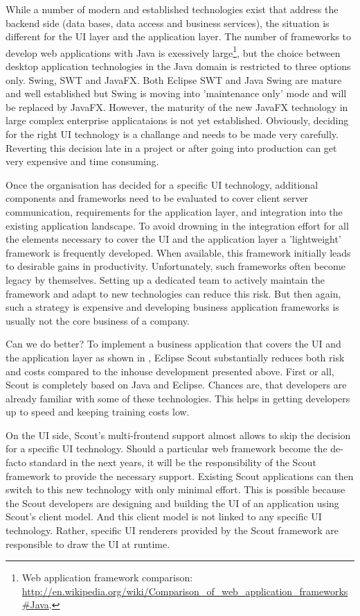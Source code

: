 \documentclass[a4paper,10pt,twoside]{book}
\begin{document}
While a number of modern and established technologies exist that address the backend side (data bases, data access and business services), the situation is different for the UI layer and the application layer. 
The number of frameworks to develop web applications with Java is exessively large\footnote{
Web application framework comparison: \url{http://en.wikipedia.org/wiki/Comparison_of_web_application_frameworks#Java}.
},
but the choice between desktop application technologies in the Java domain is restricted to three options only. 
Swing, SWT and JavaFX.
Both Eclipse SWT and Java Swing are mature and well established but Swing is moving into 'maintenance only' mode and will be replaced by JavaFX.
However, the maturity of the new JavaFX technology in large complex enterprise applicataions is not yet established. 
Obviously, deciding for the right UI technology is a challange and needs to be made very carefully. 
Reverting this decision late in a project or after going into production can get very expensive and time consuming. 

Once the organisation has decided for a specific UI technology, additional components and frameworks need to be evaluated to cover client server communication, requirements for the application layer, and integration into the existing application landscape. 
To avoid drowning in the integration effort for all the elements necessary to cover the UI and the application layer a 'lightweight' framework is frequently developed. 
When available, this framework initially leads to desirable gains in productivity. 
Unfortunately, such frameworks often become legacy by themselves. 
Setting up a dedicated team to actively maintain the framework and adapt to new technologies can reduce this risk. 
But then again, such a strategy is expensive and developing business application frameworks is usually not the core business of a company. 

Can we do better? 
To implement a business application that covers the UI and the application layer as shown in , Eclipse Scout substantially reduces both risk and costs compared to the inhouse development presented above.
First or all, Scout is completely based on Java and Eclipse. 
Chances are, that developers are already familiar with some of these technologies.
This helps in getting developers up to speed and keeping training costs low. 

On the UI side, Scout's multi-frontend support almost allows to skip the decision for a specific UI technology. 
Should a particular web framework become the de-facto standard in the next years, it will be the responsibility of the Scout framework to provide the necessary support. 
Existing Scout applications can then switch to this new technology with only minimal effort. 
This is possible because the Scout developers are designing and building the UI of an application using Scout's client model.
And this client model is not linked to any specific UI technology. 
Rather, specific UI renderers provided by the Scout framework are responsible to draw the UI at runtime. 
\end{document}
